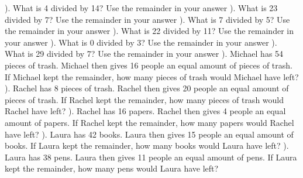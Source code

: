 \documentclass{article}%
\begin{document}
). What is 4 divided by 14? Use the remainder in your answer%
\newline%
\newline%
). What is 23 divided by 7? Use the remainder in your answer%
\newline%
\newline%
). What is 7 divided by 5? Use the remainder in your answer%
\newline%
\newline%
). What is 22 divided by 11? Use the remainder in your answer%
\newline%
\newline%
). What is 0 divided by 3? Use the remainder in your answer%
\newline%
\newline%
). What is 29 divided by 7? Use the remainder in your answer%
\newline%
\newline%
). Michael has 54 pieces of trash. Michael then gives 16 people an equal amount of pieces of trash. If Michael kept the remainder, how many pieces of trash would Michael have left?%
\newline%
\newline%
). Rachel has 8 pieces of trash. Rachel then gives 20 people an equal amount of pieces of trash. If Rachel kept the remainder, how many pieces of trash would Rachel have left?%
\newline%
\newline%
). Rachel has 16 papers. Rachel then gives 4 people an equal amount of papers. If Rachel kept the remainder, how many papers would Rachel have left?%
\newline%
\newline%
). Laura has 42 books. Laura then gives 15 people an equal amount of books. If Laura kept the remainder, how many books would Laura have left?%
\newline%
\newline%
). Laura has 38 pens. Laura then gives 11 people an equal amount of pens. If Laura kept the remainder, how many pens would Laura have left?%
\end{document}
